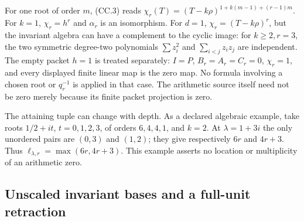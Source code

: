 For one root of order \(m\), (CC.3) reads
\(\chi_r(T)=(T-k\rho)^{1+k(m-1)+(r-1)m}\).
For \(k=1\), \(\chi_r=h^r\) and \(\alpha_r\) is an isomorphism.
For \(d=1\), \(\chi_r=(T-k\rho)^r\), but the invariant algebra
can have a complement to the cyclic image: for \(k\geq2,r=3\),
the two symmetric degree-two polynomials
\(\sum z_i^2\) and \(\sum_{i<j}z_iz_j\) are independent.
The empty packet \(h=1\) is treated separately: \(I=P\),
\(B_r=A_r=C_r=0\), \(\chi_r=1\), and every displayed finite linear
map is the zero map.  No formula involving a chosen root or
\(q_r^{-1}\) is applied in that case.  The arithmetic source itself
need not be zero merely because its finite packet projection is zero.

The attaining tuple can change with depth.  As a declared algebraic
example, take roots \(1/2+it\), \(t=0,1,2,3\), of orders \(6,4,4,1\),
and \(k=2\).  At \(\lambda=1+3i\) the only unordered pairs are
\((0,3)\) and \((1,2)\); they give respectively \(6r\) and \(4r+3\).
Thus \(\ell_{\lambda,r}=\max(6r,4r+3)\).
This example asserts no location or multiplicity of an arithmetic zero.

\subsection{Unscaled invariant bases and a full-unit retraction}

